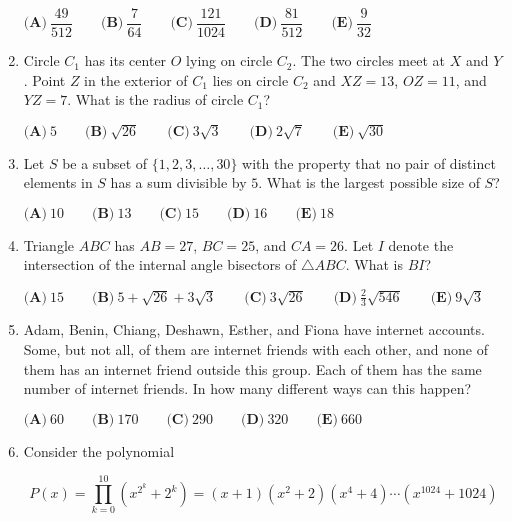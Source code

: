 \documentclass{article}
\begin{document}
\begin{enumerate}[label=\arabic*., itemsep=0.5em]
$ \textbf{(A)}\ \dfrac{49}{512}
\qquad\textbf{(B)}\ \dfrac{7}{64}
\qquad\textbf{(C)}\ \dfrac{121}{1024}
\qquad\textbf{(D)}\ \dfrac{81}{512}
\qquad\textbf{(E)}\ \dfrac{9}{32}
 $\par \vspace{0.5em}\item Circle $C_1$ has its center $O$ lying on circle $C_2$.  The two circles meet at $X$ and $Y$.  Point $Z$ in the exterior of $C_1$ lies on circle $C_2$ and $XZ=13$, $OZ=11$, and $YZ=7$.  What is the radius of circle $C_1$?

$ \textbf{(A)}\ 5\qquad\textbf{(B)}\ \sqrt{26}\qquad\textbf{(C)}\ 3\sqrt{3}\qquad\textbf{(D)}\ 2\sqrt{7}\qquad\textbf{(E)}\ \sqrt{30} $\par \vspace{0.5em}\item Let $S$ be a subset of $\{1,2,3,\dots,30\}$ with the property that no pair of distinct elements in $S$ has a sum divisible by $5$.  What is the largest possible size of $S$?

$ \textbf{(A)}\ 10\qquad\textbf{(B)}\ 13\qquad\textbf{(C)}\ 15\qquad\textbf{(D)}\ 16\qquad\textbf{(E)}\ 18 $\par \vspace{0.5em}\item Triangle $ABC$ has $AB=27$, $BC=25$, and $CA=26$.  Let $I$ denote the intersection of the internal angle bisectors of $\triangle ABC$.  What is $BI$?

$ \textbf{(A)}\ 15\qquad\textbf{(B)}\ 5+\sqrt{26}+3\sqrt{3}\qquad\textbf{(C)}\ 3\sqrt{26}\qquad\textbf{(D)}\ \frac{2}{3}\sqrt{546}\qquad\textbf{(E)}\ 9\sqrt{3} $\par \vspace{0.5em}\item Adam, Benin, Chiang, Deshawn, Esther, and Fiona have internet accounts.  Some, but not all, of them are internet friends with each other, and none of them has an internet friend outside this group.  Each of them has the same number of internet friends.  In how many different ways can this happen?

$ \textbf{(A)}\ 60
\qquad\textbf{(B)}\ 170
\qquad\textbf{(C)}\ 290
\qquad\textbf{(D)}\ 320
\qquad\textbf{(E)}\ 660
 $\par \vspace{0.5em}\item Consider the polynomial


\begin{equation*}
P(x)=\prod_{k=0}^{10}(x^{2^k}+2^k)=(x+1)(x^2+2)(x^4+4)\cdots (x^{1024}+1024)
\end{equation*}



\end{enumerate}
\end{document}

